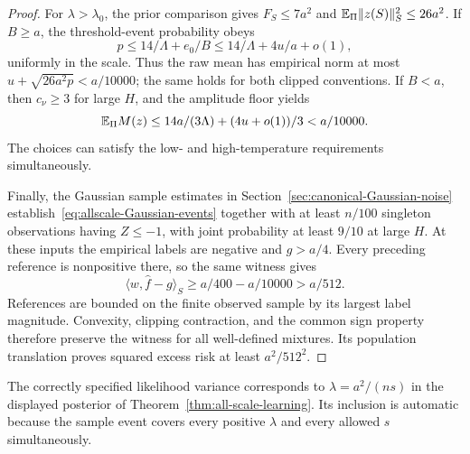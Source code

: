 \begin{proof}
For $\lambda>\lambda_0$, the prior comparison gives $F_S\le7a^2$ and
$\mathbb E_\Pi\|z(S)\|_S^2\le26a^2$. If $B\ge a$, the threshold-event probability obeys
\[
 p\le14/\Lambda+e_0/B\le14/\Lambda+4u/a+o(1),
\]
uniformly in the scale. Thus the raw mean has empirical norm at most
$u+\sqrt{26a^2p}<a/10000$; the same holds for both clipped conventions. If $B<a$, then $c_\nu\ge3$ for large $H$, and the amplitude floor yields
\[
 \mathbb E_\Pi M(z)\le14a/(3\Lambda)+(4u+o(1))/3<a/10000.
\]
The choices can satisfy the low- and high-temperature requirements simultaneously.

Finally, the Gaussian sample estimates in Section~\ref{sec:canonical-Gaussian-noise} establish~\eqref{eq:allscale-Gaussian-events} together with at least $n/100$ singleton observations having $Z\le-1$, with joint probability at least $9/10$ at large $H$. At these inputs the empirical labels are negative and $g>a/4$. Every preceding reference is nonpositive there, so the same witness gives
\[
 \langle w,\widehat f-g\rangle_S\ge a/400-a/10000>a/512.
\]
References are bounded on the finite observed sample by its largest label magnitude. Convexity, clipping contraction, and the common sign property therefore preserve the witness for all well-defined mixtures. Its population translation proves squared excess risk at least $a^2/512^2$.
\end{proof}

The correctly specified likelihood variance corresponds to $\lambda=a^2/(ns)$ in the displayed posterior of Theorem~\ref{thm:all-scale-learning}. Its inclusion is automatic because the sample event covers every positive $\lambda$ and every allowed $s$ simultaneously.
